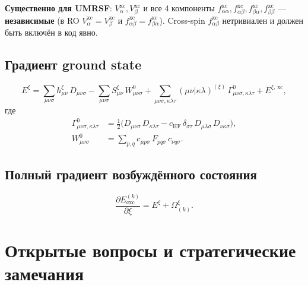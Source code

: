 \documentclass[11pt, a4paper]{article}
\theoremstyle{definition}
\newcommand{\HF}{\text{HF}}
\newcommand{\xc}{\text{xc}}
\begin{document}
\textbf{Существенно для UMRSF}: $V^{\xc}_\alpha, V^{\xc}_\beta$ и все 4 компоненты $f^{\xc}_{\alpha\alpha}, f^{\xc}_{\alpha\beta}, f^{\xc}_{\beta\alpha}, f^{\xc}_{\beta\beta}$ --- \textbf{независимые} (в RO $V^{\xc}_\alpha = V^{\xc}_\beta$ и $f^{\xc}_{\alpha\beta} = f^{\xc}_{\beta\alpha}$). Cross-spin $f^{\xc}_{\alpha\beta}$ нетривиален и должен быть включён в код явно.

\subsection{Градиент ground state}

\begin{equation}
    E^\xi = \sum_{\mu\nu\sigma} h^\xi_{\mu\nu}\, D_{\mu\nu\sigma} - \sum_{\mu\nu\sigma} S^\xi_{\mu\nu}\, W^0_{\mu\nu\sigma} + \sum_{\mu\nu\sigma, \kappa\lambda\tau} (\mu\nu | \kappa\lambda)^{(\xi)}\, \Gamma^0_{\mu\nu\sigma, \kappa\lambda\tau} + E^{\xi,\,\xc},
\end{equation}
где
\begin{align}
    \Gamma^0_{\mu\nu\sigma, \kappa\lambda\tau} &= \frac{1}{2}\bigl( D_{\mu\nu\sigma}\, D_{\kappa\lambda\tau} - c_{\HF}\, \delta_{\sigma\tau}\, D_{\mu\lambda\sigma}\, D_{\nu\kappa\sigma} \bigr), \\
    W^0_{\mu\nu\sigma} &= \sum_{p, q} c_{\mu p \sigma}\, F_{pq\sigma}\, c_{\nu q \sigma}.
\end{align}

\subsection{Полный градиент возбуждённого состояния}

\begin{equation}
    \boxed{\;
        \frac{\partial E^{(k)}_{\text{exc}}}{\partial \xi} = E^\xi + \Omega^\xi_{(k)}.
    \;}
\end{equation}

\section{Открытые вопросы и стратегические замечания}
\label{sec:openquestions}
\end{document}
